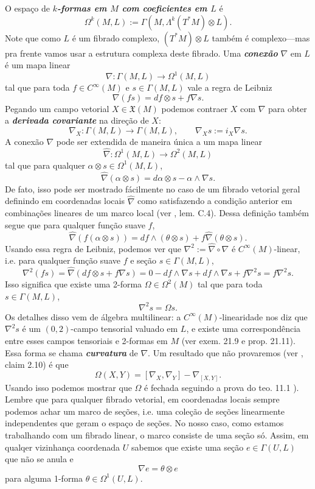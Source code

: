 O espaço de \textit{\textbf{$k$-formas em $M$ com coeficientes em $L$}} é
	\[\Omega^{k}(M,L):=\Gamma(M,\Lambda^{k}(T^*M)\otimes L).\]
Note que como $L$ é um fibrado complexo, $(T^*M)\otimes L$ também é complexo---mas pra frente vamos usar a estrutura complexa deste fibrado. Uma \textit{\textbf{conexão}} $\nabla$ em $L$ é um mapa linear
\[\nabla:\Gamma(M,L)\to\Omega^{1}(M,L)\]
tal que para toda $f\in C^\infty(M)$ e $s \in \Gamma(M,L)$ vale a regra de Leibniz
\[\nabla(fs)=df\otimes s+f\nabla s.\]
Pegando um campo vetorial $X \in \mathfrak{X}(M)$ podemos contraer $X$ com $\nabla$ para obter a \textit{\textbf{derivada covariante}} na direção de $X$:
\[\nabla_X:\Gamma(M,L)\to \Gamma(M,L), \qquad \nabla_Xs:=i_X\nabla s.\]
A conexão $\nabla$ pode ser extendida de maneira única a um mapa linear
\[\widehat{\nabla}:\Omega^{1}(M,L)\longrightarrow \Omega^{2}(M,L)\]
tal que para qualquer $\alpha \otimes s \in\Omega^{1}(M,L)$,
\[\widehat{\nabla}(\alpha \otimes s)=d\alpha \otimes s -\alpha\wedge\nabla s.\]
De fato, isso pode ser mostrado fácilmente no caso de um fibrado vetorial geral definindo em coordenadas locais $\widehat{\nabla}$ como satisfazendo a condição anterior em combinações lineares de um marco local (ver \cite{milnorch}, lem. C.4). Dessa definição também segue que para qualquer função suave $f$,
\[\widehat{\nabla}(f(\alpha \otimes s))=df \wedge (\theta \otimes s)+f \widehat{\nabla}(\theta \otimes s).\]
Usando essa regra de Leibniz, podemos ver que $\nabla^2:=\widehat{\nabla}\circ\nabla$ é $C^\infty(M)$-linear, i.e. para qualquer função suave $f$ e seção $s \in \Gamma(M,L)$,
\[\nabla^2(fs)=\widehat{\nabla}(df \otimes s+f\nabla s)=0-df \wedge \nabla s+df \wedge \nabla s+f \nabla^2s=f\nabla^2 s.\]
Isso significa que existe uma 2-forma $\Omega\in\Omega^{2}(M)$ tal que para toda $s \in \Gamma(M,L)$,
\[\nabla^2s=\Omega s.\]
Os detalhes disso vem de álgebra multilinear: a $C^\infty(M)$-linearidade nos diz que $\nabla^2s$ é um $(0,2)$-campo tensorial valuado em  $L$, e existe uma correspondência entre esses campos tensoriais e 2-formas em $M$ (ver \cite{tu-diff} exem. 21.9 e prop. 21.11). Essa forma se chama \textit{\textbf{curvatura}} de $\nabla$. Um resultado que não provaremos (ver  \cite{verbi}, claim 2.10) é que
\[\Omega(X,Y)=[\nabla_X,\nabla_Y]-\nabla_{[X,Y]}.\]
Usando isso podemos mostrar que $\Omega$ é fechada seguindo a prova do teo. 11.1 \cite{tu-diff}). Lembre que para qualquer fibrado vetorial, em coordenadas locais sempre podemos achar um marco de seções, i.e. uma coleção de seções linearmente independentes que geram o espaço de seções. No nosso caso, como estamos trabalhando com um fibrado linear, o marco consiste de uma seção só. Assim, em qualqer vizinhança coordenada $U$ sabemos que existe uma seção $e \in \Gamma(U,L)$ que não se anula e
\[\nabla e=\theta \otimes e\]
para alguma 1-forma $\theta \in \Omega^{1}(U,L)$.

